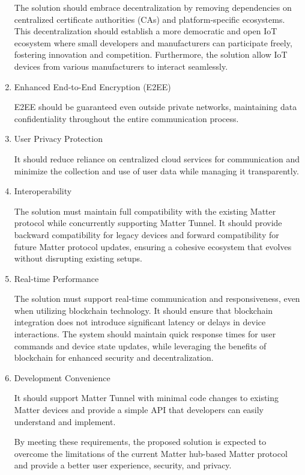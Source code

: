 \documentclass[conference]{IEEEtran}
\begin{document}
\begin{enumerate}[itemsep=2ex, parsep=1ex]
			The solution should embrace decentralization by removing dependencies on
			centralized certificate authorities (CAs) and platform-specific ecosystems.
			This decentralization should establish a more democratic and open IoT ecosystem
			where small developers and manufacturers can participate freely, fostering
			innovation and competition. Furthermore, the solution allow IoT devices
			from various manufacturers to interact seamlessly.

		\item Enhanced End-to-End Encryption (E2EE)

			E2EE should be guaranteed even outside private networks, maintaining data confidentiality
			throughout the entire communication process.

		\item User Privacy Protection

			It should reduce reliance on centralized cloud services for communication
			and minimize the collection and use of user data while managing it
			transparently.

		\item Interoperability

			The solution must maintain full compatibility with the existing Matter
			protocol while concurrently supporting Matter Tunnel. It should provide backward
			compatibility for legacy devices and forward compatibility for future Matter
			protocol updates, ensuring a cohesive ecosystem that evolves without
			disrupting existing setups.

		\item Real-time Performance

			The solution must support real-time communication and responsiveness, even
			when utilizing blockchain technology. It should ensure that blockchain
			integration does not introduce significant latency or delays in device
			interactions. The system should maintain quick response times for user commands
			and device state updates, while leveraging the benefits of blockchain for
			enhanced security and decentralization.

		\item Development Convenience

			It should support Matter Tunnel with minimal code changes to existing
			Matter devices and provide a simple API that developers can easily
			understand and implement.

			By meeting these requirements, the proposed solution is expected to overcome
			the limitations of the current Matter hub-based Matter protocol and provide
			a better user experience, security, and privacy.
	\end{enumerate}
\end{document}
